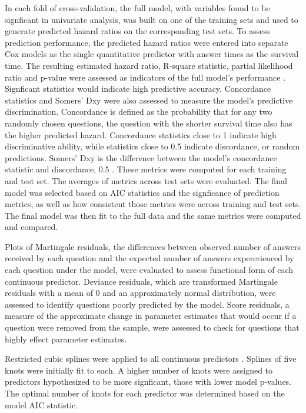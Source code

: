 \documentclass{article}
\begin{document}
In each fold of cross-validation, the full model, with variables found to be signficant in univariate analysis, was built on one of the training sets and used to generate predicted hazard ratios on the corresponding test sets. To assess prediction performance, the predicted hazard ratios were entered into separate Cox models as the single quantitative predictor with answer times as the survival time. The resulting estimated hazard ratio, R-square statistic, partial likelihood ratio and p-value were assessed as indicators of the full model's performance \citep{Chen}. Signficant statistics would indicate high predictive accuracy. Concordance statistics and Somers' Dxy were also assessed to measure the model's predictive discrimination. Concordance is defined as the probability that for any two randomly chosen questions, the question with the shorter survival time also has the higher predicted hazard. Concordance statistics close to 1 indicate high discriminative ability, while statistics close to 0.5 indicate discordance, or random predictions. Somers' Dxy is the difference between the model's concordance statistic and discordance, 0.5 \citep{Harrell2015}. These metrics were computed for each training and test set. The averages of metrics across test sets were evaluated. The final model was selected based on AIC statistics and the signficance of prediction metrics, as well as how consistent those metrics were across training and test sets. The final model was then fit to the full data and the same metrics were computed and compared. 

Plots of Martingale residuals, the differences between observed number of answers received by each question and the expected number of answers expererienced by each question under the model, were evaluated to assess functional form of each continuous predictor. Deviance residuals, which are transformed Martingale residuals with a mean of 0 and an approximately normal distribution, were assessed to identify questions poorly predicted by the model. Score residuals, a measure of the approximate change in parameter estimates that would occur if a question were removed from the sample, were assessed to check for questions that highly effect parameter estimates. 

Restricted cubic splines were applied to all continuous predictors \citep{Harrell2015}. Splines of five knots were initially fit to each. A higher number of knots were assigned to predictors hypothesized to be more signficant, those with lower model p-values. The optimal number of knots for each predictor was determined based on the model AIC statistic. 
\end{document}
